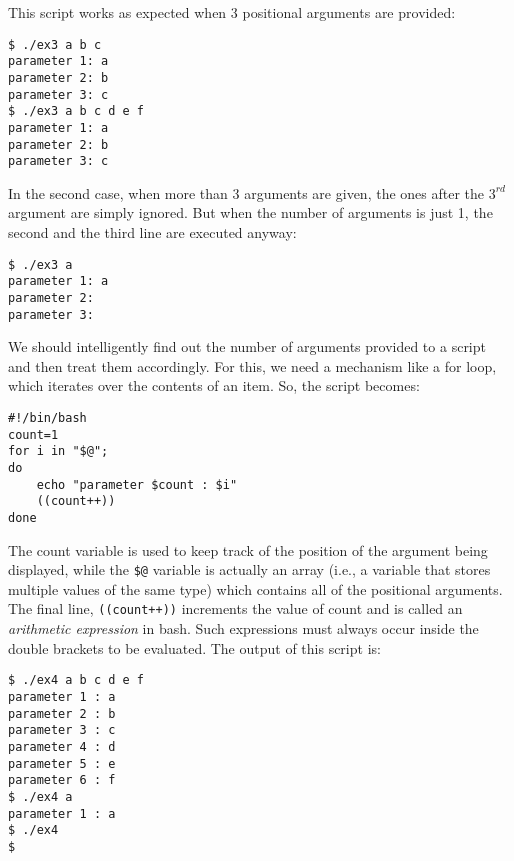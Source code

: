 \noindent
This script works as expected when 3 positional arguments are provided: 

\vspace{-15pt}
\begin{verbatim}
$ ./ex3 a b c 
parameter 1: a
parameter 2: b
parameter 3: c
$ ./ex3 a b c d e f
parameter 1: a
parameter 2: b
parameter 3: c
\end{verbatim}
\vspace{-10pt}	

\noindent
In the second case, when more than 3 arguments are given, the ones after the $3^{rd}$ argument are simply ignored. But when the number of arguments is just 1, the second and the third line are executed anyway:

\vspace{-15pt}
\begin{verbatim}
$ ./ex3 a 
parameter 1: a
parameter 2:
parameter 3:
\end{verbatim}
\vspace{-10pt}	

\noindent
We should intelligently find out the number of arguments provided to a script and then treat them accordingly. For this, we need a mechanism like a for loop, which iterates over the contents of an item. So, the script becomes:

\vspace{-15pt}
\begin{verbatim}
#!/bin/bash
count=1
for i in "$@";
do
	echo "parameter $count : $i"
	((count++))
done
\end{verbatim}
\vspace{-10pt}	

\noindent
The count variable is used to keep track of the position of the argument being displayed, while the \verb|$@| variable is actually an array (i.e., a variable that stores multiple values of the same type) which contains all of the positional arguments. The final line, \verb|((count++))| increments the value of count and is called an \textit{arithmetic expression} in bash. Such expressions must always occur inside the double brackets to be evaluated. The output of this script is:

\vspace{-15pt}
\begin{verbatim}
$ ./ex4 a b c d e f
parameter 1 : a
parameter 2 : b
parameter 3 : c
parameter 4 : d
parameter 5 : e
parameter 6 : f
$ ./ex4 a 
parameter 1 : a
$ ./ex4
$
\end{verbatim}
\vspace{-10pt}	

